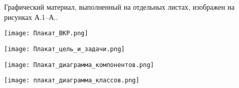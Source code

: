 
Графический материал, выполненный на отдельных листах,
изображен на рисунках А.1--А..
\setcounter{числоПлакатов}{0}

\renewcommand{\thefigure}{А.\arabic{figure}} %

\begin{landscape}

\begin{плакат}
    \texttt{[image: Плакат\_ВКР.png]}
    \label{pl1:image}      
\end{плакат}

\begin{плакат}
    \texttt{[image: Плакат\_цель\_и\_задачи.png]}
    \label{pl2:image}      
\end{плакат}

\begin{плакат}
    \texttt{[image: Плакат\_диаграмма\_компонентов.png]}
    \label{pl3:image}      
\end{плакат}

\begin{плакат}
    \texttt{[image: плакат\_диаграмма\_классов.png]}
    \label{pl4:image}      
\end{плакат}

\end{landscape}
